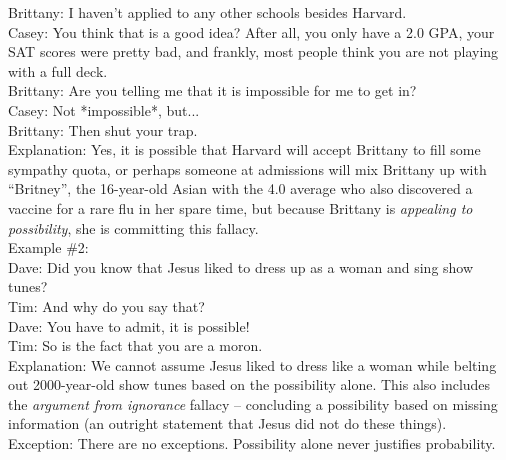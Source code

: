 \documentclass[a4paper,12pt,single,pdftex]{scrbook}
\begin{document}
    
      Brittany: I haven’t applied to any other schools besides Harvard.
    \\

    
      Casey: You think that is a good idea?  After all, you only have a 2.0 GPA, your SAT scores were pretty bad, and frankly, most people think you are not playing with a full deck.
    \\

    
      Brittany: Are you telling me that it is impossible for me to get in?
    \\

    
      Casey: Not *impossible*, but...
    \\

    
      Brittany: Then shut your trap.
    \\

    
      Explanation: Yes, it is possible that Harvard will accept Brittany to fill some sympathy quota, or perhaps someone at admissions will mix Brittany up with “Britney”, the 16-year-old Asian with the 4.0 average who also discovered a vaccine for a rare flu in her spare time, but because Brittany is {\it appealing to possibility}, she is committing this fallacy.
    \\

    
      Example \#2:
    \\

    
      Dave: Did you know that Jesus liked to dress up as a woman and sing show tunes?
    \\

    
      Tim: And why do you say that?
    \\

    
      Dave: You have to admit, it is possible!
    \\

    
      Tim: So is the fact that you are a moron.
    \\

    
      Explanation: We cannot assume Jesus liked to dress like a woman while belting out 2000-year-old show tunes based on the possibility alone. This also includes the {\it argument from ignorance} fallacy -- concluding a possibility based on missing information (an outright statement that Jesus did not do these things).
    \\

    
      Exception:  There are no exceptions. Possibility alone never justifies probability.
    \\
\end{document}
